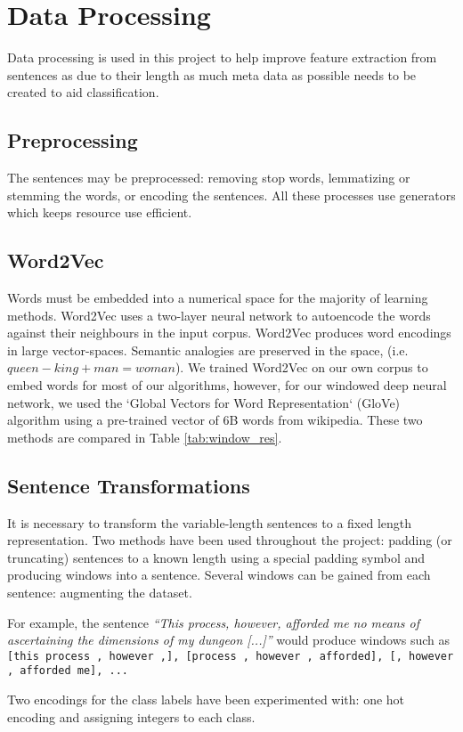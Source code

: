 \section{Data Processing}
\label{sec:data_processing}

Data processing is used in this project to help improve feature extraction from sentences as due to their length as much meta data as possible needs to be created to aid classification.

  \subsection{Preprocessing}
  \label{sec:preprocessing}
    The sentences may be preprocessed: removing stop words, lemmatizing or
    stemming the words, or encoding the sentences. All these processes use
    generators which keeps resource use efficient.

  \subsection{Word2Vec}
  \label{sec:word2vec}
  Words must be embedded into a numerical space for the majority of learning methods. Word2Vec uses a two-layer neural network to autoencode the words against their neighbours in the input corpus. Word2Vec produces word encodings in large vector-spaces. Semantic analogies are preserved in the space, (i.e. $queen - king + man = woman$). We trained Word2Vec on our own corpus to embed words for most of our algorithms, however, for our windowed deep neural network, we used the `Global Vectors for Word Representation` (GloVe) algorithm using a pre-trained vector of 6B words from wikipedia. These two methods are compared in Table \ref{tab:window_res}.

  \subsection{Sentence Transformations}
  \label{sec:sentence_transformations}

    It is necessary to transform the variable-length sentences to a fixed length
    representation. Two methods have been used throughout the project: padding
    (or truncating) sentences to a known length using a special padding symbol and
    producing windows into a sentence. Several windows can be gained from each
    sentence: augmenting the dataset.

    For example, the sentence \textit{``This process, however, afforded me no
      means of ascertaining the dimensions of my dungeon [...]''} would produce windows
    such as \texttt{[this process , however ,], [process ,
      however , afforded], [, however , afforded me], ...}

    Two encodings for the class labels have been experimented with: one hot
    encoding and assigning integers to each class.
